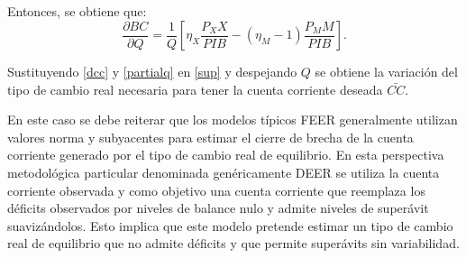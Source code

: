 \documentclass[12pt,letterpaper]{article}
\begin{document}
Entonces, se obtiene que:
\begin{equation}\label{partialq}
\frac{\partial BC}{\partial Q}=\frac{1}{Q} \left[\eta_X \frac{P_X X}{PIB}-(\eta_M -1)\frac{P_M M}{PIB}\right].
\end{equation}

Sustituyendo \ref{dcc} y \ref{partialq} en \ref{sup} y despejando $Q$ se obtiene la variación del tipo de cambio real necesaria para tener la cuenta corriente deseada $\bar{CC}$.


En este caso se debe reiterar que los modelos típicos FEER generalmente utilizan valores norma y subyacentes para estimar el cierre de brecha de la cuenta corriente generado por el tipo de cambio real de equilibrio. En esta perspectiva metodológica particular denominada genéricamente DEER se utiliza la cuenta corriente observada y como objetivo una cuenta corriente que reemplaza los déficits observados por niveles de balance nulo y admite niveles de superávit suavizándolos. Esto implica que este modelo pretende estimar un tipo de cambio real de equilibrio que no admite déficits y que permite superávits sin variabilidad. 
\end{document}
